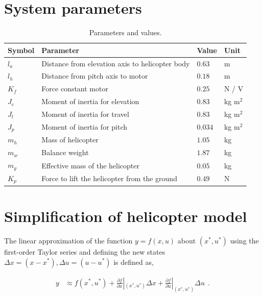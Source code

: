 

\chapter{System parameters}

\begin{table}[tbp]
	\centering
	\caption{Parameters and values.}
	\begin{tabular}{llll}
		\toprule
		Symbol & Parameter & Value & Unit \\
		\midrule
		$l_a$ & Distance from elevation axis to helicopter body & $0.63$  & m               \\
		$l_h$ & Distance from pitch axis to motor               & $0.18$  & m               \\
		$K_f$ & Force constant motor                            & $0.25$  & N / V            \\
		$J_e$ & Moment of inertia for elevation                 & $0.83$  & kg ${\text{m}^2}$ \\
		$J_t$ & Moment of inertia for travel                    & $0.83$  & kg ${\text{m}^2}$ \\
		$J_p$ & Moment of inertia for pitch                     & $0.034$ & kg ${\text{m}^2}$\\
		$m_h$ & Mass of helicopter                              & $1.05$  & kg              \\
		$m_w$ & Balance weight                                  & $1.87$  & kg              \\
		$m_g$ & Effective mass of the helicopter                & $0.05$  & kg              \\
		$K_p$ & Force to lift the helicopter from the ground    & $0.49$  & N               \\
		\bottomrule
	\end{tabular}
\label{tab:parameters}
\end{table}


\chapter{Simplification of helicopter model}\label{ch:linear_heli_model}


The linear approximation of the function $y = f(x,u)$ about $(x^*, u^*)$ using the first-order Taylor series and defining the new states $\Delta x = (x - x^*), \Delta u = (u-u^*)$ is defined as, 

\begin{equation}\label{eq:lin_approx}
    \begin{split}
        y &\approx f(x^*, u^*) + \frac{\partial f }{\partial x}|_{(x^*, u^*)} \Delta x + \frac{\partial f}{\partial u}|_{(x^*, u^*)} \Delta u \: \: .\\
    \end{split}
\end{equation}

